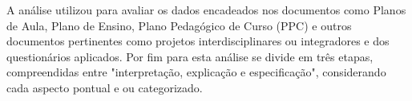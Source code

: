 A análise utilizou para avaliar os dados encadeados nos documentos como Planos de Aula, Plano de Ensino, Plano Pedagógico de Curso (PPC) e outros documentos pertinentes como projetos interdisciplinares ou integradores e dos questionários aplicados. Por fim para \cite{marconi2017fundamentos} esta análise se divide em três etapas, compreendidas entre "interpretação, explicação e especificação", considerando cada aspecto pontual e ou categorizado.